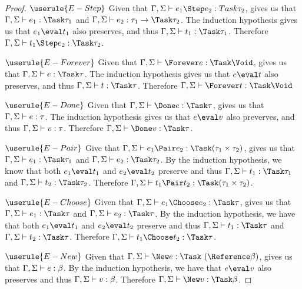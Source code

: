 \begin{proof}
  \case
     {$\userule{E-Step}$}{}
     {Given that $\Gamma,\Sigma\infers e_1\Step e_2:Task\tau_2$,  gives us that $\Gamma,\Sigma\infers e_1:\Task\tau_1$ and $\Gamma,\Sigma\infers e_2:\tau_1\to\Task \tau_2$.
     The induction hypothesis gives us that $e_1\eval t_1$ also preserves, and thus $\Gamma,\Sigma\infers t_1:\Task\tau_1$.
     Therefore $\Gamma,\Sigma\infers t_1\Step e_2:\Task\tau_2$.}

  \case
    {$\userule{E-Forever}$}
    {Given that $\Gamma,\Sigma\infers \Forever e : \Task \Void$,  gives us that $\Gamma,\Sigma\infers e:\Task \tau$.
    The induction hypothesis gives us that $e\eval t$ also preserves, and thus $\Gamma,\Sigma\infers t:\Task \tau$.
    Therefore $\Gamma,\Sigma\infers \Forever t : \Task \Void$}

  \case
    {$\userule{E-Done}$}
    {Given that $\Gamma,\Sigma\infers\Done e :\Task\tau$,  gives us that $\Gamma,\Sigma \vdash e:\tau$.
    The induction hypothesis gives us that $e\eval v$ also preverves, and thus $\Gamma,\Sigma\vdash v:\tau$.
    Therefore $\Gamma,\Sigma\infers \Done v : \Task \tau$.}

  \case
    {$\userule{E-Pair}$}
    {Give that $\Gamma,\Sigma\infers e_1\Pair e_2:\Task(\tau_1\times\tau_2)$,  gives us that $\Gamma,\Sigma\infers e_1:\Task\tau_1$ and $\Gamma,\Sigma\infers e_2:\Task\tau_2$.
    By the induction hypothesis, we know that both $e_1\eval t_1$ and $e_2\eval t_2$ preserve and thus $\Gamma,\Sigma\infers t_1:\Task\tau_1$ and $\Gamma,\Sigma\infers t_2:\Task\tau_2$.
    Therefore $\Gamma,\Sigma\infers t_1\Pair t_2:\Task(\tau_1\times\tau_2)$.}


  \case
     {$\userule{E-Choose}$}
     {Given that $\Gamma,\Sigma\infers e_1\Choose e_2:\Task\tau$,  gives us that $\Gamma,\Sigma\infers e_1:\Task\tau$ and $\Gamma,\Sigma\infers e_2:\Task\tau$.
     By the induction hypothesis, we have that both $e_1\eval t_1$ and $e_2\eval t_2$ preserve and thus $\Gamma,\Sigma\infers t_1:\Task\tau$ and $\Gamma,\Sigma\infers t_2:\Task\tau$.
     Therefore $\Gamma,\Sigma\infers t_1\Choose t_2:\Task\tau$.}

  \case
    {$\userule{E-New}$}
    {Given that $\Gamma,\Sigma\infers \New e : \Task\ (\Reference \beta)$,  gives us that $\Gamma,\Sigma\vdash e:\beta$.
    By the induction hypothesis, we have that $e\eval v$ also preserves and thus $\Gamma,\Sigma\vdash v:\beta$.
    Therefore $\Gamma,\Sigma\infers \New v:\Task \beta$.}


\end{proof}
